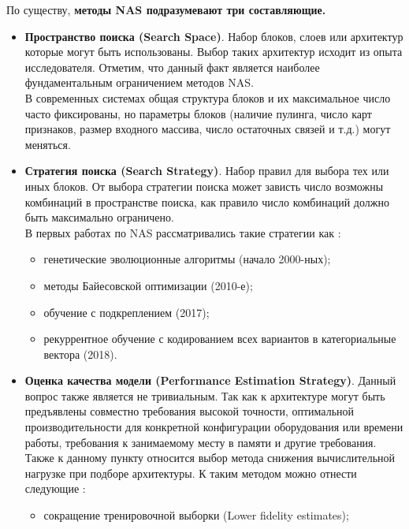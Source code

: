 \documentclass[12pt]{article}
\begin{document}
\begin{sloppypar}
По существу, \textbf{методы NAS подразумевают три составляющие.}
\begin{itemize} 
\itemsep 0.125em 
    \item \textbf{Пространство поиска (Search Space)}. Набор блоков, слоев или архитектур которые могут быть использованы. Выбор таких архитектур исходит из опыта исследователя. Отметим, что данный факт является наиболее фундаментальным ограничением методов NAS. \\
    В современных системах общая структура блоков и их максимальное число часто фиксированы, но параметры блоков (наличие пулинга, число карт признаков, размер входного массива, число остаточных связей и т.д.) могут меняться.
    \item \textbf{Стратегия поиска (Search Strategy)}. Набор правил для выбора тех или иных блоков. От выбора стратегии поиска может зависть число возможны комбинаций в пространстве поиска, как правило число комбинаций должно быть максимально ограничено. \\
    В первых работах по NAS рассматривались такие стратегии как \cite{elsken2019neural}:
    \begin{itemize} \itemsep 0.1em 
        \item генетические эволюционные алгоритмы (начало 2000-ных);
        \item методы Байесовской оптимизации (2010-е);
        \item обучение с подкреплением (2017); 
        \item рекуррентное обучение с кодированием всех вариантов в категориальные вектора (2018). 
    \end{itemize}
    \item \textbf{Оценка качества модели (Performance Estimation Strategy)}. Данный вопрос также является не тривиальным. Так как к архитектуре могут быть предъявлены совместно требования высокой точности, оптимальной производительности для конкретной конфигурации оборудования или времени работы, требования к занимаемому месту в памяти и другие требования.  \\
    Также к данному пункту относится выбор метода снижения вычислительной нагрузке при подборе архитектуры. К таким методом можно отнести следующие \cite{elsken2019neural}:
    \begin{itemize} \itemsep 0.1em 
        \item сокращение тренировочной выборки (Lower fidelity estimates); 

\end{itemize}
\end{itemize}
\end{sloppypar}
\end{document}
